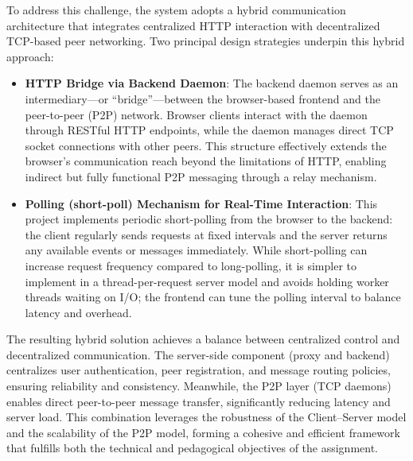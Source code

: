 To address this challenge, the system adopts a hybrid communication architecture that integrates centralized HTTP interaction with decentralized TCP-based peer networking. Two principal design strategies underpin this hybrid approach:

\begin{itemize}
    \item \textbf{HTTP Bridge via Backend Daemon}: The backend daemon serves as an intermediary—or “bridge”—between the browser-based frontend and the peer-to-peer (P2P) network. Browser clients interact with the daemon through RESTful HTTP endpoints, while the daemon manages direct TCP socket connections with other peers. This structure effectively extends the browser’s communication reach beyond the limitations of HTTP, enabling indirect but fully functional P2P messaging through a relay mechanism.
    
    \item \textbf{Polling (short-poll) Mechanism for Real-Time Interaction}: This project implements periodic short-polling from the browser to the backend: the client regularly sends requests at fixed intervals and the server returns any available events or messages immediately. While short-polling can increase request frequency compared to long-polling, it is simpler to implement in a thread-per-request server model and avoids holding worker threads waiting on I/O; the frontend can tune the polling interval to balance latency and overhead.
    
\end{itemize}

The resulting hybrid solution achieves a balance between centralized control and decentralized communication. The server-side component (proxy and backend) centralizes user authentication, peer registration, and message routing policies, ensuring reliability and consistency. Meanwhile, the P2P layer (TCP daemons) enables direct peer-to-peer message transfer, significantly reducing latency and server load. This combination leverages the robustness of the Client–Server model and the scalability of the P2P model, forming a cohesive and efficient framework that fulfills both the technical and pedagogical objectives of the assignment.
